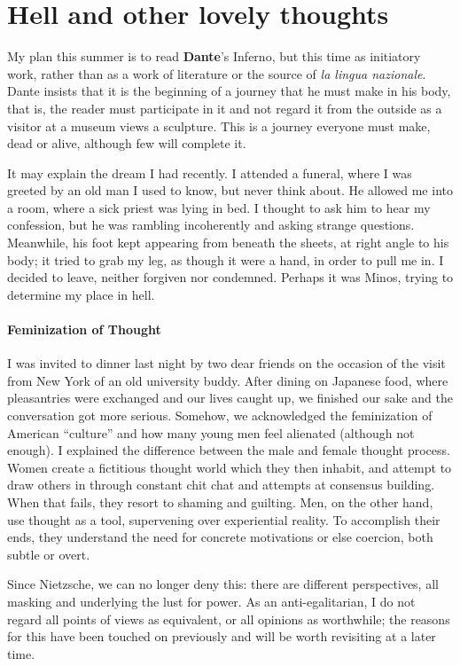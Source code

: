 \section{Hell and other lovely thoughts}

My plan this summer is to read \textbf{Dante}'s Inferno, but this time as initiatory work, rather than as a work of literature or the source of \emph{la lingua nazionale}. Dante insists that it is the beginning of a journey that he must make in his body, that is, the reader must participate in it and not regard it from the outside as a visitor at a museum views a sculpture. This is a journey everyone must make, dead or alive, although few will complete it.

It may explain the dream I had recently. I attended a funeral, where I was greeted by an old man I used to know, but never think about. He allowed me into a room, where a sick priest was lying in bed. I thought to ask him to hear my confession, but he was rambling incoherently and asking strange questions. Meanwhile, his foot kept appearing from beneath the sheets, at right angle to his body; it tried to grab my leg, as though it were a hand, in order to pull me in. I decided to leave, neither forgiven nor condemned. Perhaps it was Minos, trying to determine my place in hell.

\paragraph{Feminization of Thought}


I was invited to dinner last night by two dear friends on the occasion of the visit from New York of an old university buddy. After dining on Japanese food, where pleasantries were exchanged and our lives caught up, we finished our sake and the conversation got more serious. Somehow, we acknowledged the feminization of American ``culture'' and how many young men feel alienated (although not enough). I explained the difference between the male and female thought process. Women create a fictitious thought world which they then inhabit, and attempt to draw others in through constant chit chat and attempts at consensus building. When that fails, they resort to shaming and guilting. Men, on the other hand, use thought as a tool, supervening over experiential reality. To accomplish their ends, they understand the need for concrete motivations or else coercion, both subtle or overt.

Since Nietzsche, we can no longer deny this: there are different perspectives, all masking and underlying the lust for power. As an anti-egalitarian, I do not regard all points of views as equivalent, or all opinions as worthwhile; the reasons for this have been touched on previously and will be worth revisiting at a later time.

